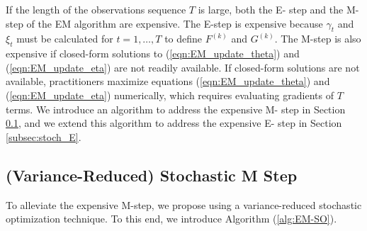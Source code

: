 
If the length of the observations sequence $T$ is large, both the E- step and the M- step of the EM algorithm are expensive. The E-step is expensive because $\gamma_t$ and $\xi_t$ must be calculated for $t = 1,\ldots,T$ to define $F^{(k)}$ and $G^{(k)}$. The M-step is also expensive if closed-form solutions to (\ref{eqn:EM_update_theta}) and (\ref{eqn:EM_update_eta}) are not readily available. If closed-form solutions are not available, practitioners maximize equations (\ref{eqn:EM_update_theta}) and (\ref{eqn:EM_update_eta}) numerically, which requires evaluating gradients of $T$ terms. We introduce an algorithm to address the expensive M- step in Section \ref{subsec:stoch_M}, and we extend this algorithm to address the expensive E- step in Section \ref{subsec:stoch_E}.

\subsection{(Variance-Reduced) Stochastic M Step}
\label{subsec:stoch_M}

To alleviate the expensive M-step, we propose using a variance-reduced stochastic optimization technique. To this end, we introduce Algorithm (\ref{alg:EM-SO}).

